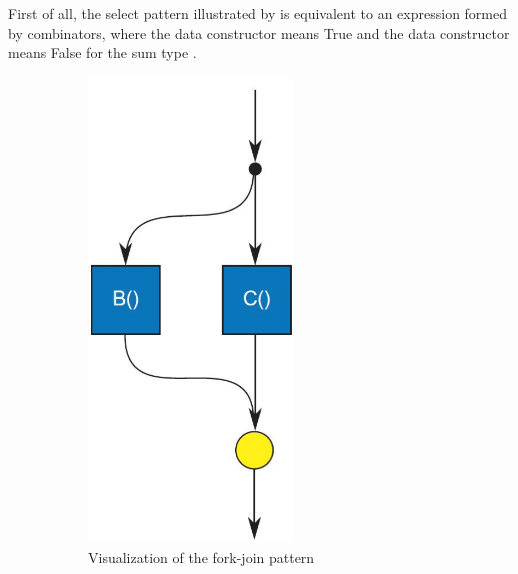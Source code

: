 First of all, the select pattern illustrated by  is equivalent to an expression formed by \hask{|||} combinators, where the data constructor  means True and the data constructor  means False for the sum type .
\begin{figure}[ht]
    \begin{subfigure}[b]{0.475\textwidth}
       \centering
       \includegraphics[width=0.60\textwidth]{arrow/fork.png}
        \caption{Visualization of the fork-join pattern \cite{mccoolStructuredParallelPrograming2012}}
        \label{arrowPipe:fig:fork}
    \end{subfigure}
    \hfill
   \begin{subfigure}[b]{0.475\textwidth}
        \centering

\end{subfigure}
\end{figure}
